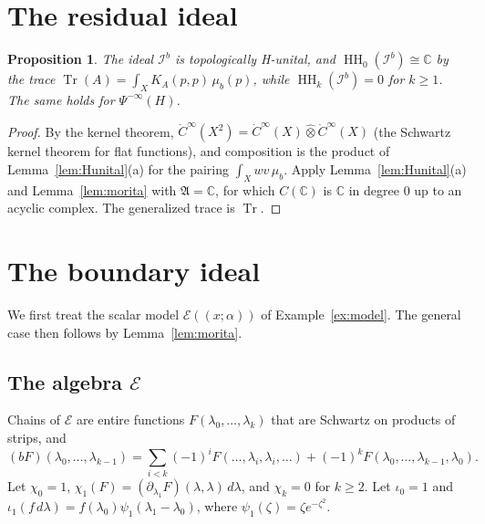 \documentclass[11pt,oneside,reqno]{article}
\DeclareMathOperator{\HH}{HH}
\newcommand{\C}{\mathbb C}
\DeclareMathOperator{\Tr}{Tr}
\newcommand{\cE}{\mathcal E}
\newcommand{\Ib}{\mathcal I^b}
\theoremstyle{plain}
\newtheorem{proposition}[theorem]{Proposition}
\theoremstyle{definition}
\theoremstyle{remark}
\newcommand{\Lser}[1]{(\!(#1)\!)}
\begin{document}
\section{The residual ideal}\label{sec:I}

\begin{proposition}\label{prop:I}
The ideal \(\Ib\) is topologically H-unital, and \(\HH_0(\Ib)\cong\C\) by
the trace \(\Tr(A)=\int_XK_A(p,p)\,\mu_b(p)\), while \(\HH_k(\Ib)=0\) for
\(k\geq1\). The same holds for \(\Psi^{-\infty}(H)\).
\end{proposition}

\begin{proof}
By the kernel theorem, \(\dot C^\infty(X^2)=\dot C^\infty(X)\widehat\otimes
\dot C^\infty(X)\) (the Schwartz kernel theorem for flat functions), and composition is
the product of Lemma~\ref{lem:Hunital}(a) for the pairing
\(\int_Xwv\,\mu_b\). Apply Lemma~\ref{lem:Hunital}(a) and
Lemma~\ref{lem:morita} with \(\mathfrak A=\C\), for which \(C(\C)\) is
\(\C\) in degree \(0\) up to an acyclic complex. The generalized trace is
\(\Tr\).
\end{proof}

\section{The boundary ideal}\label{sec:Id}

We first treat the scalar model \(\cE\Lser{x;\alpha}\) of
Example~\ref{ex:model}. The general case then follows by
Lemma~\ref{lem:morita}.

\subsection{\texorpdfstring{The algebra \(\cE\)}{The algebra E}}
Chains of \(\cE\) are entire functions \(F(\lambda_0,\dots,\lambda_k)\)
that are Schwartz on products of strips, and
\[
 (bF)(\lambda_0,\dots,\lambda_{k-1})
 =\sum_{i<k}(-1)^iF(\dots,\lambda_i,\lambda_i,\dots)
 +(-1)^kF(\lambda_0,\dots,\lambda_{k-1},\lambda_0).
\]
Let \(\chi_0=1\), \(\chi_1(F)=(\partial_{\lambda_1}F)(\lambda,\lambda)\,
d\lambda\), and \(\chi_k=0\) for \(k\geq2\). Let \(\iota_0=1\) and
\(\iota_1(f\,d\lambda)=f(\lambda_0)\psi_1(\lambda_1-\lambda_0)\), where
\(\psi_1(\zeta)=\zeta e^{-\zeta^2}\).
\end{document}
